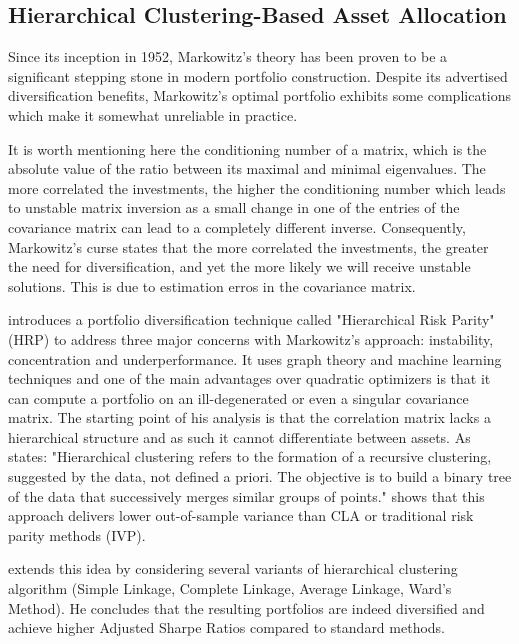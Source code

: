 \subsection{Hierarchical Clustering-Based Asset Allocation}

Since its inception in 1952, Markowitz's theory has been proven to be a significant stepping stone in modern portfolio construction. Despite its advertised diversification benefits, Markowitz's optimal portfolio exhibits some complications which make it somewhat unreliable in practice. 

It is worth mentioning here the conditioning number of a matrix, which is the absolute value of the ratio between its maximal and minimal eigenvalues. The more correlated the investments, the higher the conditioning number which leads to unstable matrix inversion as a small change in one of the entries of the covariance matrix can lead to a completely different inverse. Consequently, Markowitz's curse states that the more correlated the investments, the greater the need for diversification, and yet the more likely we will receive unstable solutions. This is due to estimation erros in the covariance matrix.

\citet{de2016building} introduces a portfolio diversification technique called "Hierarchical Risk Parity" (HRP) to address three major concerns with Markowitz's approach: instability, concentration and underperformance. It uses graph theory and machine learning techniques and one of the main advantages over quadratic optimizers is that it can compute a portfolio on an ill-degenerated or even a singular covariance matrix. The starting point of his analysis is that the correlation matrix lacks a hierarchical structure and as such it cannot differentiate between assets. As \citet{raffinot2017hierarchical} states: "Hierarchical clustering refers to the formation of a recursive clustering, suggested by the data, not defined a priori. The objective is to build a binary tree of the data that successively merges similar groups of points." \citet{de2016building} shows that this approach delivers lower out-of-sample variance than CLA or traditional risk parity methods (IVP).


\citet{raffinot2017hierarchical} extends this idea by considering several variants of hierarchical clustering algorithm (Simple Linkage, Complete Linkage, Average Linkage, Ward’s Method). He concludes that the resulting portfolios are indeed diversified and achieve higher Adjusted Sharpe Ratios compared to standard methods.




